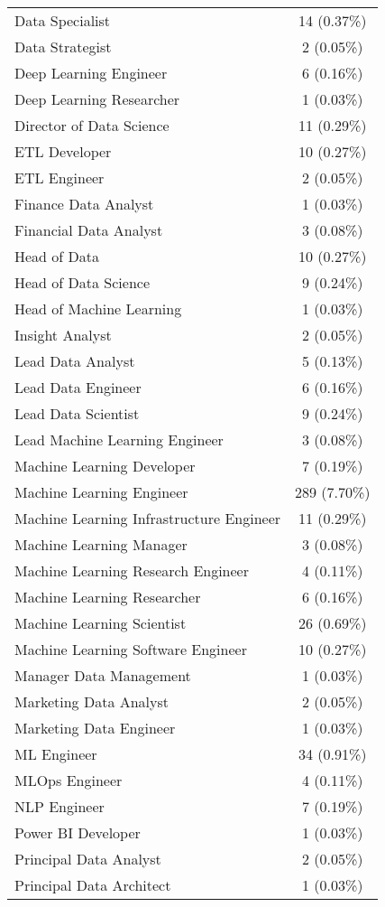 \documentclass[
]{article}
\begin{document}
\begin{longtable}[]{@{}lc@{}}
Data Specialist & 14 (0.37\%) \\
Data Strategist & 2 (0.05\%) \\
Deep Learning Engineer & 6 (0.16\%) \\
Deep Learning Researcher & 1 (0.03\%) \\
Director of Data Science & 11 (0.29\%) \\
ETL Developer & 10 (0.27\%) \\
ETL Engineer & 2 (0.05\%) \\
Finance Data Analyst & 1 (0.03\%) \\
Financial Data Analyst & 3 (0.08\%) \\
Head of Data & 10 (0.27\%) \\
Head of Data Science & 9 (0.24\%) \\
Head of Machine Learning & 1 (0.03\%) \\
Insight Analyst & 2 (0.05\%) \\
Lead Data Analyst & 5 (0.13\%) \\
Lead Data Engineer & 6 (0.16\%) \\
Lead Data Scientist & 9 (0.24\%) \\
Lead Machine Learning Engineer & 3 (0.08\%) \\
Machine Learning Developer & 7 (0.19\%) \\
Machine Learning Engineer & 289 (7.70\%) \\
Machine Learning Infrastructure Engineer & 11 (0.29\%) \\
Machine Learning Manager & 3 (0.08\%) \\
Machine Learning Research Engineer & 4 (0.11\%) \\
Machine Learning Researcher & 6 (0.16\%) \\
Machine Learning Scientist & 26 (0.69\%) \\
Machine Learning Software Engineer & 10 (0.27\%) \\
Manager Data Management & 1 (0.03\%) \\
Marketing Data Analyst & 2 (0.05\%) \\
Marketing Data Engineer & 1 (0.03\%) \\
ML Engineer & 34 (0.91\%) \\
MLOps Engineer & 4 (0.11\%) \\
NLP Engineer & 7 (0.19\%) \\
Power BI Developer & 1 (0.03\%) \\
Principal Data Analyst & 2 (0.05\%) \\
Principal Data Architect & 1 (0.03\%) \\

\end{longtable}
\end{document}
